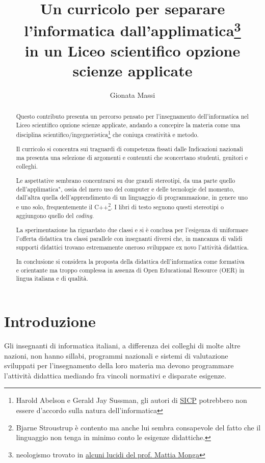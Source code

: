 \documentclass{easychair}
\title{Un curricolo per separare l'informatica dall'applimatica\thanks{neologismo %
trovato in \href{https://aladdin.unimi.it/materiali/talk/2012_mirabilandia.pdf}%
{alcuni lucidi del prof. Mattia Monga}}\\ in un %
Liceo scientifico opzione scienze applicate}
\author{
Gionata Massi\institute{
  IIS Savoia Benincasa, Ancona (AN)
 }
}
\institute{
  IIS Savoia Benincasa, Ancona (AN)\\
  \email{gionata.massi@savoiabenincasa.it}
}
\begin{document}
\maketitle

\begin{abstract}
Questo contributo presenta un percorso pensato per l'insegnamento dell'informatica
nel Liceo scientifico opzione scienze applicate, andando a concepire la materia come
una disciplina scientifico/ingegneristica\footnote{Harold Abelson e 
Gerald Jay Sussman, gli autori di \href{https://web.mit.edu/6.001/6.037/sicp.pdf}{SICP}
potrebbero non essere d'accordo sulla natura dell'informatica} che coniuga creatività e metodo.

Il curricolo si concentra sui traguardi di competenza fissati dalle Indicazioni
nazionali~\cite{indicazioniNazionali}
ma presenta una selezione di argomenti e contenuti
che sconcertano studenti, genitori e colleghi.

Le aspettative sembrano concentrarsi su due grandi stereotipi,
da una parte quello dell'applimatica$\phantom{}^\star$,
ossia del mero uso del computer e delle tecnologie del momento,
dall'altra quella dell'apprendimento di un linguaggio di programmazione, in genere uno e uno solo,
frequentemente il C++\footnote{Bjarne Stroustrup è contento ma anche lui sembra
consapevole del fatto che il linguaggio non tenga in minimo conto le esigenze didattiche.}.
I libri di testo seguono questi stereotipi o aggiungono quello del \textit{coding}.

La sperimentazione ha riguardato due classi e si è conclusa per l'esigenza
di uniformare l'offerta didattica tra classi parallele con insegnanti diversi che,
in mancanza di validi supporti didattici trovano estremamente oneroso sviluppare
ex novo l'attività didattica.

In conclusione si considera la proposta della didattica dell'informatica come
formativa e orientante ma troppo complessa in assenza di 
Open Educational Resource (OER) in lingua italiana e di qualità.
\end{abstract}

\setcounter{tocdepth}{2}
{\small
\tableofcontents}

\section{Introduzione}
\label{sect:introduction}

Gli insegnanti di informatica italiani, a differenza dei colleghi di molte
altre nazioni, non hanno sillabi, programmi nazionali e sistemi di valutazione
sviluppati per l'insegnamento della loro materia ma devono
programmare l'attività didattica mediando fra vincoli normativi e
disparate esigenze.
\end{document}
